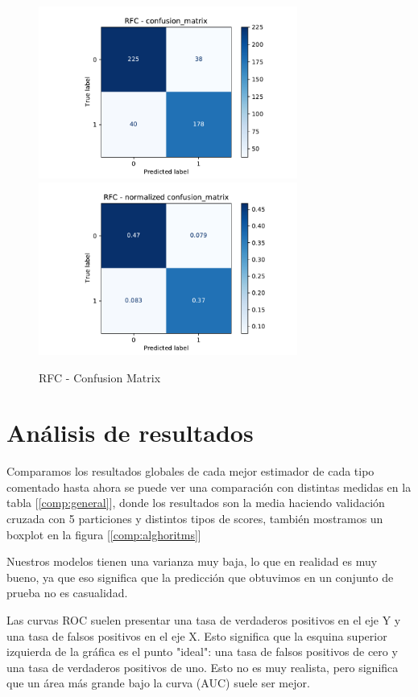 \documentclass[12pt,twoside]{report}
\begin{document}
\begin{figure}[htp]
\begin{multicols}{2}
\includegraphics[width=8.5cm]{./code/figures_python/confusion_matrix/rfc.pdf}%
\columnbreak
\includegraphics[width=8.5cm]{./code/figures_python/confusion_matrix/rfc_normalized.pdf}%
\end{multicols}
 \caption{RFC - Confusion Matrix}
  \label{rfc:matrix}
 \end{figure}


\chapter*{Análisis de resultados}

Comparamos los resultados globales de cada mejor estimador de cada tipo comentado hasta ahora se puede ver una comparación con distintas medidas en la tabla [\ref{comp:general}], donde los resultados son la media haciendo validación cruzada con 5 particiones y distintos tipos de scores, también mostramos un boxplot en la figura [\ref{comp:alghoritms}]

Nuestros modelos tienen una varianza muy baja, lo que en realidad es muy bueno, ya que eso significa que la predicción que obtuvimos en un conjunto de prueba no es casualidad.

Las curvas ROC suelen presentar una tasa de verdaderos positivos en el eje Y y una tasa de falsos positivos en el eje X. Esto significa que la esquina superior izquierda de la gráfica es el punto "ideal": una tasa de falsos positivos de cero y una tasa de verdaderos positivos de uno. Esto no es muy realista, pero significa que un área más grande bajo la curva (AUC) suele ser mejor.
\end{document}
